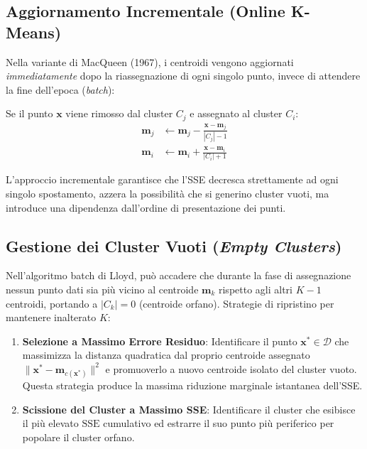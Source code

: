 \FloatBarrier
\subsection{Aggiornamento Incrementale (Online K-Means)}

Nella variante di MacQueen (1967), i centroidi vengono aggiornati \textit{immediatamente} dopo la riassegnazione di ogni singolo punto, invece di attendere la fine dell'epoca (\textit{batch}):
\begin{property}
Se il punto $\mathbf{x}$ viene rimosso dal cluster $C_j$ e assegnato al cluster $C_i$:
\begin{align}
    \mathbf{m}_j &\leftarrow \mathbf{m}_j - \frac{\mathbf{x} - \mathbf{m}_j}{|C_j| - 1} \label{eq:dm-macqueen-remove} \\
    \mathbf{m}_i &\leftarrow \mathbf{m}_i + \frac{\mathbf{x} - \mathbf{m}_i}{|C_i| + 1} \label{eq:dm-macqueen-add}
\end{align}
\end{property}
L'approccio incrementale garantisce che l'SSE decresca strettamente ad ogni singolo spostamento, azzera la possibilità che si generino cluster vuoti, ma introduce una dipendenza dall'ordine di presentazione dei punti.

\FloatBarrier
\subsection{Gestione dei Cluster Vuoti (\textit{Empty Clusters})}

Nell'algoritmo batch di Lloyd, può accadere che durante la fase di assegnazione nessun punto dati sia più vicino al centroide $\mathbf{m}_k$ rispetto agli altri $K-1$ centroidi, portando a $|C_k| = 0$ (centroide orfano).
Strategie di ripristino per mantenere inalterato $K$:
\begin{enumerate}
    \item \textbf{Selezione a Massimo Errore Residuo}: Identificare il punto $\mathbf{x}^* \in \mathcal{D}$ che massimizza la distanza quadratica dal proprio centroide assegnato $\|\mathbf{x}^* - \mathbf{m}_{c(\mathbf{x}^*)}\|^2$ e promuoverlo a nuovo centroide isolato del cluster vuoto. Questa strategia produce la massima riduzione marginale istantanea dell'SSE.
    \item \textbf{Scissione del Cluster a Massimo SSE}: Identificare il cluster che esibisce il più elevato $\mathrm{SSE}$ cumulativo ed estrarre il suo punto più periferico per popolare il cluster orfano.
\end{enumerate}

